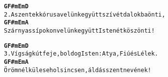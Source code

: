 \cleardoublepage
{}
\kottastart
{}
\kottaend
\begin{minipage}{\textwidth}
\begin{alltt}
\textbf{       G             F#m            Em           D}
2. A szentek kórusa velünk együtt szívét dalokba önti,
\textbf{     G               F#m          Em             A}
   Szárnyas sípokon velünk együtt Istenét köszönti!
\end{alltt}
\vspace{0.0cm}
\versszakspacing
\end{minipage}
\begin{minipage}{\textwidth}
\begin{alltt}
\textbf{    G               F#m          Em            D}
3. Vígság kútfeje, boldog Isten: Atya, Fiú és Lélek.
\textbf{   G             F#m           Em               A}
   Öröm nélküle sehol sincsen, áldás szent nevének!
\end{alltt}
\vspace{0.0cm}
\versszakspacing
\end{minipage}
~\vspace{1.0cm}
\newline
